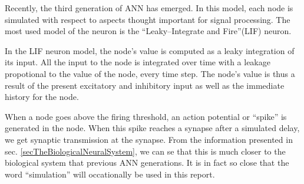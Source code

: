
%
%

Recently, the third generation of ANN has emerged. In this model, each node is simulated with respect to aspects thought important for signal processing.
The most used model of the neuron is the ``Leaky--Integrate and Fire''(LIF) neuron. %

In the LIF neuron model, the node's value is computed as a leaky integration of its input. %
All the input to the node is integrated over time with a leakage propotional to the value of the node, every time step.
The node's value is thus a result of the present excitatory and inhibitory input as well as the immediate history for the node.

When a node goes above the firing threshold, an action potential or ``spike'' is generated in the node. 
When this spike reaches a synapse after a simulated delay, we get synaptic transmission at the synapse.
From the information presented in sec. \ref{secTheBiologicalNeuralSystem}, we can se that this is much closer to the biological system that previous ANN generations.
It is in fact so close that the word ``simulation'' will occationally be used in this report.

